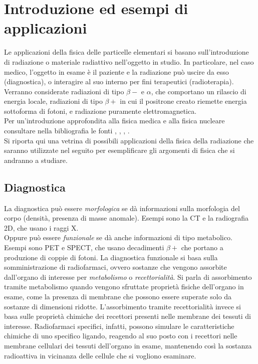 
\chapter{Introduzione ed esempi di applicazioni}

Le applicazioni della fisica delle particelle elementari si basano sull'introduzione di radiazione o materiale radiattivo nell'oggetto in studio. In particolare, nel caso medico, l'oggetto in esame è il paziente e la radiazione può uscire da esso (diagnostica), o interagire al suo interno per fini terapeutici (radioterapia).
Verranno considerate radiazioni di tipo $\beta-$ e $\alpha$, che comportano un rilascio di energia locale, radiazioni di tipo $\beta+$ in cui il positrone creato riemette energia sottoforma di fotoni, e radiazione puramente elettromagnetica.\\
Per un'introduzione approfondita alla fisica medica e alla fisica nucleare consultare nella bibliografia le fonti \cite{ENMP} \cite{NMP}, \cite{CLA}, \cite{Corvisiero3}, \cite{Nutshell}.\\

Si riporta qui una vetrina di possibili applicazioni della fisica della radiazione che saranno utilizzate nel seguito per esemplificare gli argomenti di fisica che si andranno a studiare.

\section{Diagnostica}

La diagnostica può essere \emph{morfologica} se dà informazioni sulla morfologia del corpo (densità, presenza di masse anomale). Esempi sono la CT e la radiografia 2D, che usano i raggi X.\\
Oppure può essere \emph{funzionale} se dà anche informazioni di tipo metabolico. Esempi sono PET e SPECT, che usano decadimenti $\beta+$ che portano a produzione di coppie di fotoni.
La diagnostica funzionale si basa sulla somministrazione di radiofarmaci, ovvero sostanze che vengono assorbite dall'organo di interesse per \emph{metabolismo} o \emph{recettorialità}. Si parla di assorbimento tramite metabolismo quando vengono sfruttate proprietà fisiche dell'organo in esame, come la presenza di membrane che possono essere superate solo da sostanze di dimensioni ridotte. L'assorbimento tramite recettorialità invece si basa sulle proprietà chimiche dei recettori presenti nelle membrane dei tessuti di interesse. Radiofarmaci specifici, infatti, possono simulare le caratteristiche chimiche di uno specifico ligando, reagendo al suo posto con i recettori nelle membrane cellulari dei tessuti dell'organo in esame, mantenendo così la sostanza radioattiva in vicinanza delle cellule che si vogliono esaminare.

